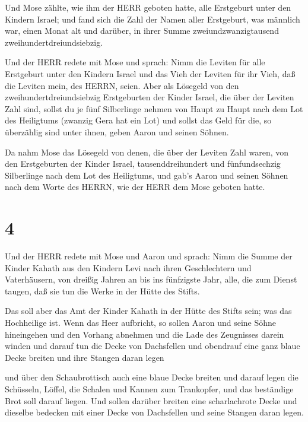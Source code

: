  Und Mose zählte, wie ihm der HERR geboten hatte, alle
Erstgeburt unter den Kindern Israel;  und fand sich die
Zahl der Namen aller Erstgeburt, was männlich war, einen Monat alt und
darüber, in ihrer Summe zweiundzwanzigtausend zweihundertdreiundsiebzig.

 Und der HERR redete mit Mose und sprach: 
Nimm die Leviten für alle Erstgeburt unter den Kindern Israel und das
Vieh der Leviten für ihr Vieh, daß die Leviten mein, des HERRN, seien.
 Aber als Lösegeld von den zweihundertdreiundsiebzig
Erstgeburten der Kinder Israel, die über der Leviten Zahl sind,
 sollst du je fünf Silberlinge nehmen von Haupt zu Haupt
nach dem Lot des Heiligtums (zwanzig Gera hat ein Lot)  und
sollst das Geld für die, so überzählig sind unter ihnen, geben Aaron und
seinen Söhnen.

 Da nahm Mose das Lösegeld von denen, die über der Leviten
Zahl waren,  von den Erstgeburten der Kinder Israel,
tausenddreihundert und fünfundsechzig Silberlinge nach dem Lot des
Heiligtums,  und gab's Aaron und seinen Söhnen nach dem
Worte des HERRN, wie der HERR dem Mose geboten hatte.

\hypertarget{section-3}{%
\section{4}\label{section-3}}

 Und der HERR redete mit Mose und Aaron und sprach:
 Nimm die Summe der Kinder Kahath aus den Kindern Levi nach
ihren Geschlechtern und Vaterhäusern,  von dreißig Jahren an
bis ins fünfzigste Jahr, alle, die zum Dienst taugen, daß sie tun die
Werke in der Hütte des Stifts.

 Das soll aber das Amt der Kinder Kahath in der Hütte des
Stifts sein; was das Hochheilige ist.  Wenn das Heer
aufbricht, so sollen Aaron und seine Söhne hineingehen und den Vorhang
abnehmen und die Lade des Zeugnisses darein winden  und
darauf tun die Decke von Dachsfellen und obendrauf eine ganz blaue Decke
breiten und ihre Stangen daran legen

 und über den Schaubrottisch auch eine blaue Decke breiten
und darauf legen die Schüsseln, Löffel, die Schalen und Kannen zum
Trankopfer, und das beständige Brot soll darauf liegen.  Und
sollen darüber breiten eine scharlachrote Decke und dieselbe bedecken
mit einer Decke von Dachsfellen und seine Stangen daran legen.

